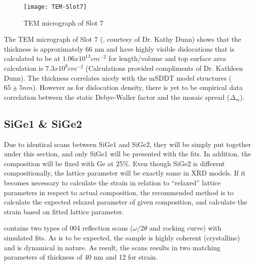 \begin{figure}[h]
\caption{TEM micrograph of Slot 7}
\label{TEM-Slot7}
\texttt{[image: TEM-Slot7]}
\end{figure}

The TEM micrograph of Slot 7 (, courtesy of Dr. Kathy Dunn)  shows that the thickness is approximately 66 nm and have highly visible dislocations that is calculated to be at $1.06 x 10^{13} cm^{-2}$ for length/volume and top surface area calculation is $7.3 x 10^9 cm^{-2}$ (Calculations provided compliments of Dr. Kathleen Dunn).  The thickness correlates nicely with the mSDDT model structures ($65 \pm 5 nm$).  However as for dislocation density, there is yet to be empirical data correlation between the static Debye-Waller factor and the mosaic spread ($\Delta_m$).


\subsection{SiGe1 \& SiGe2}

Due to identical scans between SiGe1 and SiGe2, they will be simply put together under this section, and only SiGe1 will be presented with the fits.  In addition, the composition will be fixed with Ge at 25\%.  Even though SiGe2 is different compositionally, the lattice parameter will be exactly same in XRD models.  If it becomes necessary to calculate the strain in relation to ``relaxed'' lattice parameters in respect to actual composition, the recommended method is to calculate the expected relaxed parameter of given composition, and calculate the strain based on fitted lattice parameter.

 contains two types of 004 reflection scans ($\omega/2\theta$ and rocking curve) with simulated fits.  As is to be expected, the sample is highly coherent (crystalline) and is dynamical in nature.  As result, the scans results in two matching parameters of thickness of 40 nm and 12 for strain.  

